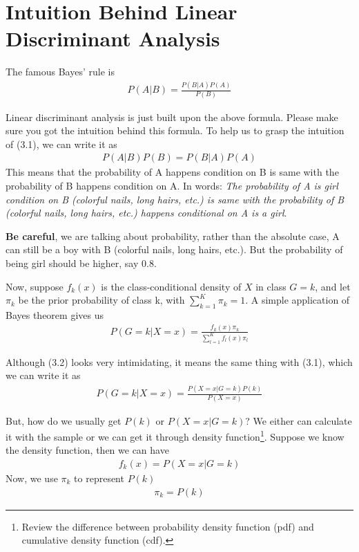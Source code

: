 \documentclass[12pt]{article}
\theoremstyle{definition}
\numberwithin{equation}{section}
\numberwithin{figure}{section}
\numberwithin{table}{section}
\begin{document}
\section{Intuition Behind Linear Discriminant Analysis}

The famous Bayes' rule is
\begin{align}
	P(A|B) = \frac{P(B|A)P(A)}{P(B)}
\end{align}

Linear discriminant analysis is just built upon the above formula. Please make sure you got the intuition behind this formula. To help us to grasp the intuition of (3.1), we can write it as 
\begin{align*}
	P(A|B)P(B) = P(B|A)P(A)
\end{align*}
This means that the probability of A happens condition on B is same with the probability of B happens condition on A. In words: \textit{The probability of A is girl condition on B (colorful nails, long hairs, etc.) is same with the probability of B (colorful nails, long hairs, etc.) happens conditional on A is a girl}. 

\textbf{Be careful}, we are talking about probability, rather than the absolute case, A can still be a boy with B (colorful nails, long hairs, etc.). But the probability of being girl should be higher, say 0.8. 

Now, suppose $f_k(x)$ is the class-conditional density of $X$ in class $G = k$, and let $\pi_k$ be the prior probability of class k, with $\sum_{k = 1}^K \pi_k = 1$. A simple application of Bayes theorem gives us
\begin{align}
  P(G = k | X = x) = \frac{f_k(x) \pi_k}{\sum_{l = 1}^K f_l(x) \pi_l}
\end{align}

Although (3.2) looks very intimidating, it means the same thing with (3.1), which we can write it as
\begin{align*}
	P(G = k | X = x) = \frac{P(X = x| G = k)P(k)}{P(X = x)}
\end{align*}

But, how do we usually get $P(k)$ or $P(X = x| G = k)$? We either can calculate it with the sample or we can get it through density function\footnote{Review the difference between probability density function (pdf) and cumulative density function (cdf).}. Suppose we know the density function, then we can have 
\begin{align*}
	f_k(x) = P(X = x| G = k)
\end{align*}
Now, we use $\pi_k$ to represent $P(k)$
\begin{align*}
	\pi_k = P(k)
\end{align*}
\end{document}

